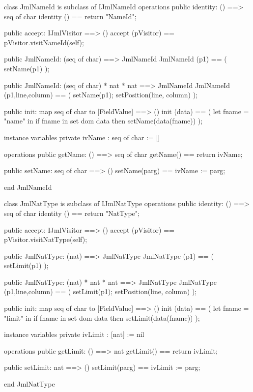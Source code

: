 \begin{vdm_al}
class JmlNameId is subclass of IJmlNameId
operations
  public identity: () ==> seq of char
  identity () == return "NameId";

  public accept: IJmlVisitor ==> ()
  accept (pVisitor) == pVisitor.visitNameId(self);

  public JmlNameId:
    (seq of char) ==> JmlNameId
  JmlNameId (p1) == 
    ( setName(p1) );

  public JmlNameId:
    (seq of char) *
    nat *
    nat ==> JmlNameId
  JmlNameId (p1,line,column) == 
    ( setName(p1);
      setPosition(line, column) );

  public init: map seq of char to [FieldValue] ==> ()
  init (data) ==
    ( let fname = "name" in
        if fname in set dom data
        then setName(data(fname)) );

instance variables
  private ivName : seq of char := []

operations
  public getName: () ==> seq of char
  getName() == return ivName;

  public setName: seq of char ==> ()
  setName(parg) == ivName := parg;

end JmlNameId
\end{vdm_al}

\begin{vdm_al}
class JmlNatType is subclass of IJmlNatType
operations
  public identity: () ==> seq of char
  identity () == return "NatType";

  public accept: IJmlVisitor ==> ()
  accept (pVisitor) == pVisitor.visitNatType(self);

  public JmlNatType:
    (nat) ==> JmlNatType
  JmlNatType (p1) == 
    ( setLimit(p1) );

  public JmlNatType:
    (nat) *
    nat *
    nat ==> JmlNatType
  JmlNatType (p1,line,column) == 
    ( setLimit(p1);
      setPosition(line, column) );

  public init: map seq of char to [FieldValue] ==> ()
  init (data) ==
    ( let fname = "limit" in
        if fname in set dom data
        then setLimit(data(fname)) );

instance variables
  private ivLimit : [nat] := nil

operations
  public getLimit: () ==> nat
  getLimit() == return ivLimit;

  public setLimit: nat ==> ()
  setLimit(parg) == ivLimit := parg;

end JmlNatType
\end{vdm_al}

